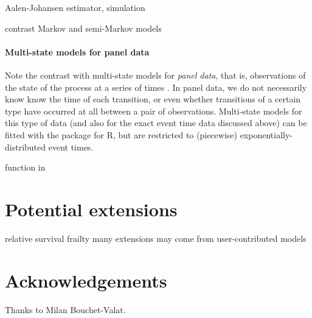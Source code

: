 \documentclass[nojss,nofooter]{jss}
\begin{document}
Aalen-Johansen estimator,  simulation

contrast Markov and semi-Markov models

\paragraph{Multi-state models for panel data}

Note the contrast with multi-state models for \emph{panel data}, that
is, observations of the state of the process at a series of times
\citep{kalbfleisch:lawless}.  In panel data, we do not necessarily
know know the time of each transition, or even whether transitions of
a certain type have occurred at all between a pair of observations.
Multi-state models for this type of data (and also for the exact event
time data discussed above) can be fitted with the  package
for R, but are restricted to (piecewise) exponentially-distributed
event times.



 function in  


\section{Potential extensions}

relative survival
frailty 
many extensions may come from user-contributed models


\appendix
\section{Acknowledgements}
Thanks to Milan Bouchet-Valat.


\end{document}
